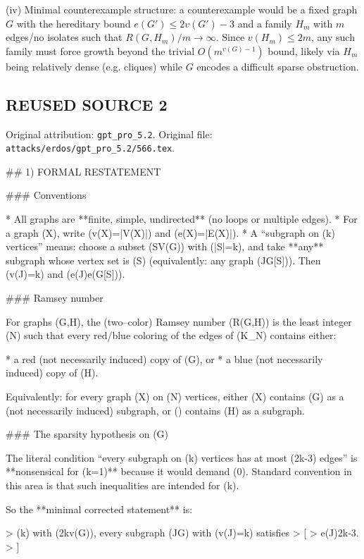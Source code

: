 (iv) Minimal counterexample structure: a counterexample would be a fixed graph $G$ with the hereditary bound $e(G')\le 2v(G')-3$ and a family $H_m$ with $m$ edges/no isolates such that $R(G,H_m)/m\to\infty$.
Since $v(H_m)\le 2m$, any such family must force growth beyond the trivial $O(m^{v(G)-1})$ bound, likely via $H_m$ being relatively dense (e.g. cliques) while $G$ encodes a difficult sparse obstruction.




\subsection*{REUSED SOURCE 2}
Original attribution: \texttt{gpt\_pro\_5.2}.
Original file: \texttt{attacks/erdos/gpt\_pro\_5.2/566.tex}.

## 1) FORMAL RESTATEMENT

### Conventions

* All graphs are **finite, simple, undirected** (no loops or multiple edges).
* For a graph (X), write (v(X)=|V(X)|) and (e(X)=|E(X)|).
* A “subgraph on (k) vertices” means: choose a subset (S\subseteq V(G)) with (|S|=k), and take **any** subgraph whose vertex set is (S) (equivalently: any graph (J\subseteq G[S])). Then (v(J)=k) and (e(J)\le e(G[S])).

### Ramsey number

For graphs (G,H), the (two–color) Ramsey number (R(G,H)) is the least integer (N) such that every red/blue coloring of the edges of (K_N) contains either:

* a red (not necessarily induced) copy of (G), or
* a blue (not necessarily induced) copy of (H).

Equivalently: for every graph (X) on (N) vertices, either (X) contains (G) as a (not necessarily induced) subgraph, or () contains (H) as a subgraph.

### The sparsity hypothesis on (G)

The literal condition “every subgraph on (k) vertices has at most (2k-3) edges” is **nonsensical for (k=1)** because it would demand (0). Standard convention in this area is that such inequalities are intended for (k).

So the **minimal corrected statement** is:

> (\forall k\in{}) with (2\le k\le v(G)), every subgraph (J\subseteq G) with (v(J)=k) satisfies
> [
> e(J)\le 2k-3.
> ]

